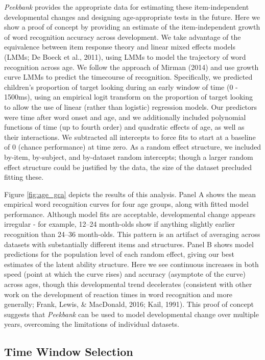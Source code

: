\documentclass[10pt, letterpaper]{article}
\begin{document}
\emph{Peekbank} provides the appropriate data for estimating these
item-independent developmental changes and designing age-appropriate
tests in the future. Here we show a proof of concept by providing an
estimate of the item-independent growth of word recognition accuracy
across development. We take advantage of the equivalence between item
response theory and linear mixed effects models (LMMs; De Boeck et al.,
2011), using LMMs to model the trajectory of word recognition across
age. We follow the approach of Mirman (2014) and use growth curve LMMs
to predict the timecourse of recognition. Specifically, we predicted
children's proportion of target looking during an early window of time
(0 - 1500ms), using an empirical logit transform on the proportion of
target looking to allow the use of linear (rather than logistic)
regression models. Our predictors were time after word onset and age,
and we additionally included polynomial functions of time (up to fourth
order) and quadratic effects of age, as well as their interactions. We
subtracted all intercepts to force fits to start at a baseline of 0
(chance performance) at time zero. As a random effect structure, we
included by-item, by-subject, and by-dataset random intercepts; though a
larger random effect structure could be justified by the data, the size
of the dataset precluded fitting these.

Figure \ref{fig:age_gca} depicts the results of this analysis. Panel A
shows the mean empirical word recognition curves for four age groups,
along with fitted model performance. Although model fits are acceptable,
developmental change appears irregular - for example, 12--24 month-olds
show if anything slightly earlier recognition than 24--36 month-olds.
This pattern is an artifact of averaging across datasets with
substantially different items and structures. Panel B shows model
predictions for the population level of each random effect, giving our
best estimates of the latent ability structure. Here we see continuous
increases in both speed (point at which the curve rises) and accuracy
(asymptote of the curve) across ages, though this developmental trend
decelerates (consistent with other work on the development of reaction
times in word recognition and more generally; Frank, Lewis, \&
MacDonald, 2016; Kail, 1991). This proof of concept suggests that
\emph{Peekbank} can be used to model developmental change over multiple
years, overcoming the limitations of individual datasets.

\hypertarget{time-window-selection}{%
\subsection{Time Window Selection}\label{time-window-selection}}
\end{document}

